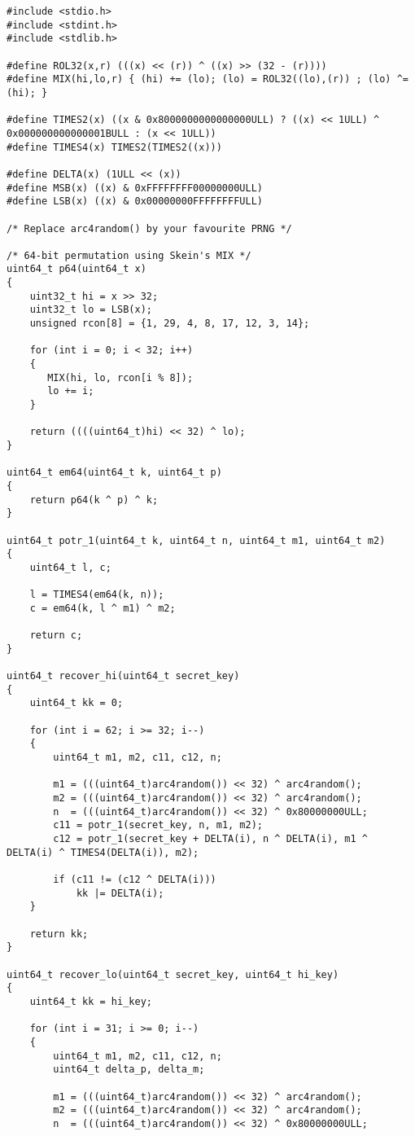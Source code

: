 \begin{verbatim}
#include <stdio.h>
#include <stdint.h>
#include <stdlib.h>

#define ROL32(x,r) (((x) << (r)) ^ ((x) >> (32 - (r))))
#define MIX(hi,lo,r) { (hi) += (lo); (lo) = ROL32((lo),(r)) ; (lo) ^= (hi); }

#define TIMES2(x) ((x & 0x8000000000000000ULL) ? ((x) << 1ULL) ^                0x000000000000001BULL : (x << 1ULL))
#define TIMES4(x) TIMES2(TIMES2((x)))

#define DELTA(x) (1ULL << (x))
#define MSB(x) ((x) & 0xFFFFFFFF00000000ULL)
#define LSB(x) ((x) & 0x00000000FFFFFFFFULL)

/* Replace arc4random() by your favourite PRNG */

/* 64-bit permutation using Skein's MIX */
uint64_t p64(uint64_t x)
{
	uint32_t hi = x >> 32;
	uint32_t lo = LSB(x);
	unsigned rcon[8] = {1, 29, 4, 8, 17, 12, 3, 14};

	for (int i = 0; i < 32; i++)
	{
	   MIX(hi, lo, rcon[i % 8]);
	   lo += i;
	}

	return ((((uint64_t)hi) << 32) ^ lo);
}

uint64_t em64(uint64_t k, uint64_t p)
{
	return p64(k ^ p) ^ k;
}

uint64_t potr_1(uint64_t k, uint64_t n, uint64_t m1, uint64_t m2)
{
	uint64_t l, c;

	l = TIMES4(em64(k, n));
	c = em64(k, l ^ m1) ^ m2;

	return c;
}

uint64_t recover_hi(uint64_t secret_key)
{
	uint64_t kk = 0;

	for (int i = 62; i >= 32; i--)
	{
		uint64_t m1, m2, c11, c12, n;

		m1 = (((uint64_t)arc4random()) << 32) ^ arc4random();
		m2 = (((uint64_t)arc4random()) << 32) ^ arc4random();
		n  = (((uint64_t)arc4random()) << 32) ^ 0x80000000ULL;
		c11 = potr_1(secret_key, n, m1, m2);
		c12 = potr_1(secret_key + DELTA(i), n ^ DELTA(i), m1 ^ DELTA(i) ^ TIMES4(DELTA(i)), m2);

		if (c11 != (c12 ^ DELTA(i)))
			kk |= DELTA(i);
	}

	return kk;
}

uint64_t recover_lo(uint64_t secret_key, uint64_t hi_key)
{
	uint64_t kk = hi_key;

	for (int i = 31; i >= 0; i--)
	{
		uint64_t m1, m2, c11, c12, n;
		uint64_t delta_p, delta_m;

		m1 = (((uint64_t)arc4random()) << 32) ^ arc4random();
		m2 = (((uint64_t)arc4random()) << 32) ^ arc4random();
		n  = (((uint64_t)arc4random()) << 32) ^ 0x80000000ULL;


\end{verbatim}
